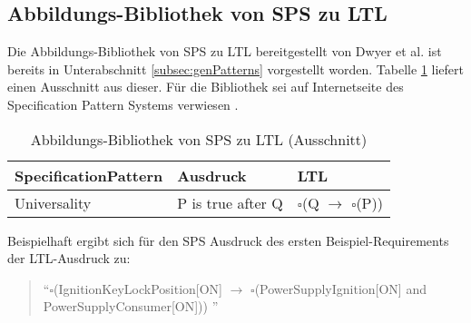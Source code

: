 \subsection{Abbildungs-Bibliothek von SPS zu LTL}
\label{subsec:sps2ltl_lib}
Die Abbildungs-Bibliothek von SPS zu LTL bereitgestellt von Dwyer et al. ist bereits in Unterabschnitt \ref{subsec:genPatterns} vorgestellt worden. Tabelle \ref{tab:extract_sps2ltl_lib} liefert einen Ausschnitt aus dieser. Für die Bibliothek sei auf Internetseite des Specification Pattern Systems verwiesen \cite{DACDAP17}.\\
\begin{table}[H]
	\centering
	\begin{tabularx}{\textwidth}{p{}|p{}|p{}}
		\hline
		Specification\newline Pattern & Ausdruck & LTL \\ \hline
		Universality & P is true after Q & $\square$(Q $\rightarrow$ $\square$(P)) \\ 
	\end{tabularx}
	\caption{Abbildungs-Bibliothek von SPS zu LTL (Ausschnitt) \cite{DACDAP17}}
	\label{tab:extract_sps2ltl_lib}
\end{table}
Beispielhaft ergibt sich für den SPS Ausdruck des ersten Beispiel-Requirements der LTL-Ausdruck zu:
\begin{quote}
	"`$\square$(IgnitionKeyLockPosition[ON] $\rightarrow$ $\square$(PowerSupplyIgnition[ON] and PowerSupplyConsumer[ON])) "' 
\end{quote}
